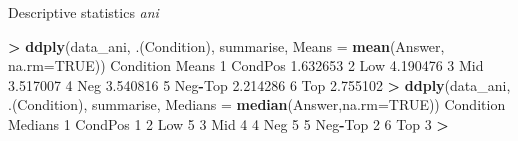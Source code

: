\documentclass[ignorenonframetext,]{beamer}
\newenvironment{Shaded}{\begin{snugshade}}{\end{snugshade}}
\newcommand{\KeywordTok}[1]{\textcolor[rgb]{0.13,0.29,0.53}{\textbf{#1}}}
\newcommand{\DataTypeTok}[1]{\textcolor[rgb]{0.13,0.29,0.53}{#1}}
\newcommand{\DecValTok}[1]{\textcolor[rgb]{0.00,0.00,0.81}{#1}}
\newcommand{\FloatTok}[1]{\textcolor[rgb]{0.00,0.00,0.81}{#1}}
\newcommand{\StringTok}[1]{\textcolor[rgb]{0.31,0.60,0.02}{#1}}
\newcommand{\OtherTok}[1]{\textcolor[rgb]{0.56,0.35,0.01}{#1}}
\newcommand{\OperatorTok}[1]{\textcolor[rgb]{0.81,0.36,0.00}{\textbf{#1}}}
\newcommand{\NormalTok}[1]{#1}
\begin{document}
\begin{frame}[fragile]{Descriptive statistics \emph{ani}}

\tiny 

\begin{Shaded}
\begin{Highlighting}[]
\OperatorTok{>}\StringTok{ }\KeywordTok{ddply}\NormalTok{(data_ani, .(Condition), summarise, }\DataTypeTok{Means =} \KeywordTok{mean}\NormalTok{(Answer, }\DataTypeTok{na.rm=}\OtherTok{TRUE}\NormalTok{))}
\NormalTok{  Condition    Means}
\DecValTok{1}\NormalTok{   CondPos }\FloatTok{1.632653}
\DecValTok{2}\NormalTok{       Low }\FloatTok{4.190476}
\DecValTok{3}\NormalTok{       Mid }\FloatTok{3.517007}
\DecValTok{4}\NormalTok{       Neg }\FloatTok{3.540816}
\DecValTok{5}\NormalTok{   Neg}\OperatorTok{-}\NormalTok{Top }\FloatTok{2.214286}
\DecValTok{6}\NormalTok{       Top }\FloatTok{2.755102}
\OperatorTok{>}\StringTok{ }\KeywordTok{ddply}\NormalTok{(data_ani, .(Condition), summarise, }\DataTypeTok{Medians =} \KeywordTok{median}\NormalTok{(Answer,}\DataTypeTok{na.rm=}\OtherTok{TRUE}\NormalTok{))}
\NormalTok{  Condition Medians}
\DecValTok{1}\NormalTok{   CondPos       }\DecValTok{1}
\DecValTok{2}\NormalTok{       Low       }\DecValTok{5}
\DecValTok{3}\NormalTok{       Mid       }\DecValTok{4}
\DecValTok{4}\NormalTok{       Neg       }\DecValTok{5}
\DecValTok{5}\NormalTok{   Neg}\OperatorTok{-}\NormalTok{Top       }\DecValTok{2}
\DecValTok{6}\NormalTok{       Top       }\DecValTok{3}
\OperatorTok{>}\StringTok{ }
\end{Highlighting}
\end{Shaded}

\end{frame}
\end{document}
